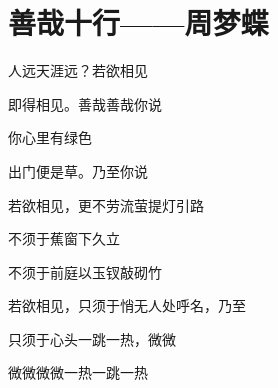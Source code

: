 \section{善哉十行——周梦蝶}

人远天涯远？若欲相见

即得相见。善哉善哉你说

你心里有绿色

出门便是草。乃至你说

若欲相见，更不劳流萤提灯引路

不须于蕉窗下久立

不须于前庭以玉钗敲砌竹

若欲相见，只须于悄无人处呼名，乃至

只须于心头一跳一热，微微

微微微微一热一跳一热
